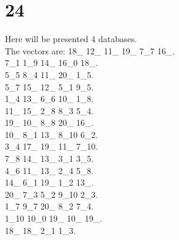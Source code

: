 \chapter{24}
\indent Here will be presented 4 databases.\\
The vectors are:
18\_ 12\_ 11\_ 19\_ 7\_7 16\_.\\7\_1 1\_9 14\_ 16\_0 18\_.\\5\_5 8\_4 11\_ 20\_ 1\_5.\\5\_7 15\_ 12\_ 5\_1 9\_5.\\1\_4 13\_ 6\_6 10\_ 1\_8.\\11\_ 15\_ 2\_8 8\_3 5\_4.\\19\_ 10\_ 8\_8 20\_ 16\_.\\10\_ 8\_1 13\_ 8\_10 6\_2.\\3\_4 17\_ 19\_ 11\_ 7\_10.\\7\_8 14\_ 13\_ 3\_1 3\_5.\\4\_6 11\_ 13\_ 2\_4 5\_8.\\14\_ 6\_1 19\_ 1\_2 13\_.\\20\_ 7\_3 5\_2 9\_10 2\_3.\\1\_7 9\_7 20\_ 8\_2 7\_4.\\1\_10 10\_0 19\_ 10\_ 19\_.\\18\_ 18\_ 2\_1 1\_3.\\